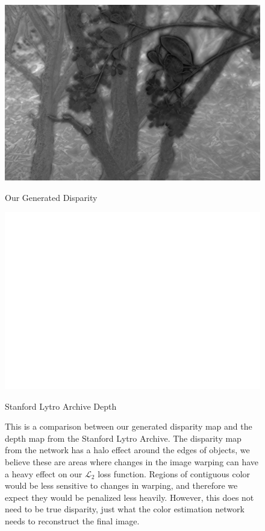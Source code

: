 \documentclass[10pt,twocolumn,letterpaper]{article}
\begin{document}
\begin{figure}[h]
    \begin{multicols}{2}
        \includegraphics[width=\linewidth]{flowers_25/ours_05_05_disp.png}\par\caption*{Our Generated Disparity}
        \includegraphics[width=\linewidth]{flowers_25/stanford_depth.png}\par\caption*{Stanford Lytro Archive Depth}
    \end{multicols}
    \caption{
        This is a comparison between our generated disparity map and the depth map from the Stanford Lytro Archive.
        The disparity map from the network has a halo effect around the edges of objects, we believe these are areas where changes
        in the image warping can have a heavy effect on our $\mathcal{L}_2$ loss function. Regions of contiguous color
        would be less sensitive to changes in warping, and therefore we expect they would be penalized less heavily.
        However, this does not need to be true disparity, just what the color estimation network needs to reconstruct the final image.
    }
\end{figure}
\end{document}
